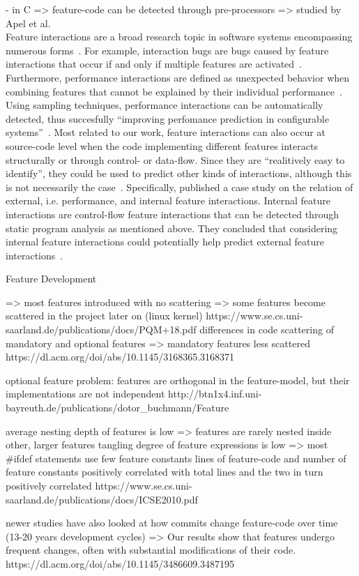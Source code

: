 - in C => feature-code can be detected through pre-processors => studied by Apel et al. \\
Feature interactions are a broad research topic in software systems encompassing numerous forms~\cite{apel2014feature}.
For example, interaction bugs are bugs caused by feature interactions that occur if and only if multiple features are activated~\cite{nie2011survey}.
Furthermore, performance interactions are defined as unexpected behavior when combining features that cannot be explained by their individual performance~\cite{siegmund2012predicting}.
Using sampling techniques, performance interactions can be automatically detected, thus succesfully ``improving perfomance prediction in configurable systems''~\cite{apel2014feature}.
Most related to our work, feature interactions can also occur at source-code level when the code implementing different features interacts structurally or through control- or data-flow.
Since they are ``realitively easy to identify''\cite{apel2014feature}, they could be used to predict other kinds of interactions, although this is not necessarily the case~\cite{apel2014feature}.
Specifically, \citet{kolesnikov2017relation} published a case study on the relation of external, i.e. performance, and internal feature interactions.  
Internal feature interactions are control-flow feature interactions that can be detected through static program analysis as mentioned above. 
They concluded that considering internal feature interactions could potentially help predict external feature interactions~\cite{kolesnikov2017relation}.  

Feature Development

=> most features introduced with no scattering => some features become scattered in the project later on (linux kernel)
https://www.se.cs.uni-saarland.de/publications/docs/PQM+18.pdf
differences in code scattering of mandatory and optional features => mandatory features less scattered
https://dl.acm.org/doi/abs/10.1145/3168365.3168371

optional feature problem: features are orthogonal in the feature-model, but their implementations are not independent
http://btn1x4.inf.uni-bayreuth.de/publications/dotor_buchmann/Feature%

average nesting depth of features is low => features are rarely nested inside other, larger features
tangling degree of feature expressions is low => most #ifdef statements use few feature constants
lines of feature-code and number of feature constants positively correlated with total lines and the two in turn positively correlated
https://www.se.cs.uni-saarland.de/publications/docs/ICSE2010.pdf

newer studies have also looked at how commits change feature-code over time (13-20 years development cycles)
=> Our results show that features undergo frequent changes, often with substantial modifications of their code. 
https://dl.acm.org/doi/abs/10.1145/3486609.3487195
























